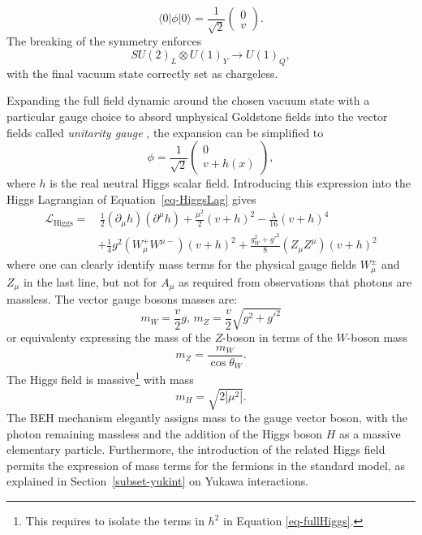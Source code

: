 \begin{equation}
\langle0|\phi|0 \rangle = \frac{1}{\sqrt{2}} \begin{pmatrix}
        0\\ 
        v
    \end{pmatrix}.
\end{equation}
The breaking of the symmetry enforces \[ SU(2)_L \otimes U(1)_Y \rightarrow U(1)_Q,\] with the final vacuum state correctly set as chargeless.

Expanding the full field dynamic around the chosen vacuum state with a particular gauge choice to absord unphysical Goldstone fields into the vector fields called \textit{unitarity gauge} \cite{PhysRevD.7.1068}, the expansion can be simplified to 
\begin{equation}
    \phi = \frac{1}{\sqrt{2}} \begin{pmatrix}
            0\\ 
            v + h(x)
        \end{pmatrix},
\end{equation}
where $h$ is the real neutral Higgs scalar field. Introducing this expression into the Higgs Lagrangian of Equation~\ref{eq-HiggsLag} gives
\begin{equation}\label{eq-fullHiggs}
    \begin{split}
        \mathcal{L}_{\text{Higgs}} = & \,\frac{1}{2} (\partial_\mu h)(\partial^\mu h) + \frac{\mu^2}{2}(v+h)^2  - \frac{\lambda}{16}(v+h)^4 \\
        &+ \frac{1}{4} g^2 (W_{\mu}^+W^{\mu-})(v+h)^2 + \frac{g^2_W + {g'}^2}{8}(Z_{\mu}Z^{\mu})(v+h)^2 
    \end{split}
\end{equation}
where one can clearly identify mass terms for the physical gauge fields $W_{\mu}^{\pm}$ and $Z_\mu$ in the last line, but not for $A_{\mu}$ as required from observations that photons are massless. The vector gauge bosons masses are:
\begin{equation}
    m_W = \frac{v}{2} g , \, m_Z = \frac{v}{2}\sqrt{g^2 +g'^2} 
\end{equation}
or equivalenty expressing the mass of the $Z$-boson in terms of the $W$-boson mass \[m_Z = \frac{m_W}{\cos\theta_W}.\] The Higgs field is massive\footnote{This requires to isolate the terms in $h^2$ in Equation \ref{eq-fullHiggs}.} with mass \[m_H = \sqrt{2|\mu^2|}.\]
The BEH mechanism elegantly assigns mass to the gauge vector boson, with the photon remaining massless and the addition of the Higgs boson $H$ as a massive elementary particle. Furthermore, the introduction of the related Higgs field permits the expression of mass terms for the fermions in the standard model, as explained in Section~\ref{subset-yukint} on Yukawa interactions. 

